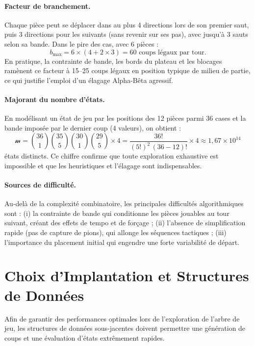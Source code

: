 \documentclass[12pt,a4paper]{article}
\begin{document}
\paragraph{Facteur de branchement.}
Chaque pièce peut se déplacer dans au plus 4 directions lors de son premier saut, puis 3 directions pour les suivants (sans revenir sur ses pas), avec jusqu'à 3 sauts selon sa bande. Dans le pire des cas, avec 6 pièces :
\[
b_{\max} = 6 \times (4 + 2 \times 3) = 60 \text{ coups légaux par tour.}
\]
En pratique, la contrainte de bande, les bords du plateau et les blocages ramènent ce facteur à 15--25 coups légaux en position typique de milieu de partie, ce qui justifie l'emploi d'un élagage Alpha-Bêta agressif.

\paragraph{Majorant du nombre d'états.}
En modélisant un état de jeu par les positions des 12 pièces parmi 36 cases et la bande imposée par le dernier coup (4 valeurs), on obtient :
\[
\mathcal{m} = \binom{36}{1}\binom{35}{5}\binom{30}{1}\binom{29}{5} \times 4 = \frac{36!}{(5!)^2\,(36-12)!} \times 4 \approx 1{,}67 \times 10^{14}
\]
états distincts. Ce chiffre confirme que toute exploration exhaustive est impossible et que les heuristiques et l'élagage sont indispensables.

\paragraph{Sources de difficulté.}
Au-delà de la complexité combinatoire, les principales difficultés algorithmiques sont : (i) la contrainte de bande qui conditionne les pièces jouables au tour suivant, créant des effets de tempo et de forçage ; (ii) l'absence de simplification rapide (pas de capture de pions), qui allonge les séquences tactiques ; (iii) l'importance du placement initial qui engendre une forte variabilité de départ.

\section{Choix d'Implantation et Structures de Données}
Afin de garantir des performances optimales lors de l'exploration de l'arbre de jeu, les structures de données sous-jacentes doivent permettre une génération de coups et une évaluation d'états extrêmement rapides.
\end{document}
